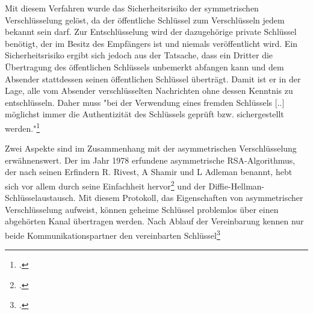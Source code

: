 \documentclass  [paper=a4,
				fontsize=12pt,
				listof=totoc,
				bibliography=totoc
				]{scrreprt}
\begin{document}
				Mit diesem Verfahren wurde das Sicherheitsrisiko der symmetrischen Verschlüsselung gelöst, da der öffentliche Schlüssel zum Verschlüsseln jedem bekannt sein darf. Zur Entschlüsselung wird der dazugehörige private Schlüssel benötigt, der im Besitz des Empfängers ist und niemals veröffentlicht wird.
				Ein Sicherheitsrisiko ergibt sich jedoch aus der Tatsache, dass ein Dritter die Übertragung des öffentlichen Schlüssels unbemerkt abfangen kann und dem Absender stattdessen seinen öffentlichen Schlüssel überträgt. Damit ist er in der Lage, alle vom Absender verschlüsselten Nachrichten ohne dessen Kenntnis zu entschlüsseln. Daher muss "bei der Verwendung eines fremden Schlüssels [..] möglichst immer die Authentizität des Schlüssels geprüft bzw. sichergestellt werden."\footcite[S. 90]{Ertel2012}
				
				Zwei Aspekte sind im Zusammenhang mit der asymmetrischen Verschlüsselung erwähnenswert. Der im Jahr 1978 erfundene asymmetrische RSA-Algorithmus, der nach seinen Erfindern R. Rivest, A Shamir und L Adleman benannt, hebt sich vor allem durch seine Einfachheit hervor\footcite[S. 79]{Ertel2012} und der Diffie-Hellman-Schlüsselaustausch. Mit diesem Protokoll, das Eigenschaften von asymmetrischer Verschlüsselung aufweist, können geheime Schlüssel problemlos über einen abgehörten Kanal übertragen werden. Nach Ablauf der Vereinbarung kennen nur beide Kommunikationspartner den vereinbarten Schlüssel\footcite[S. 129]{Stephan2011}
\end{document}

